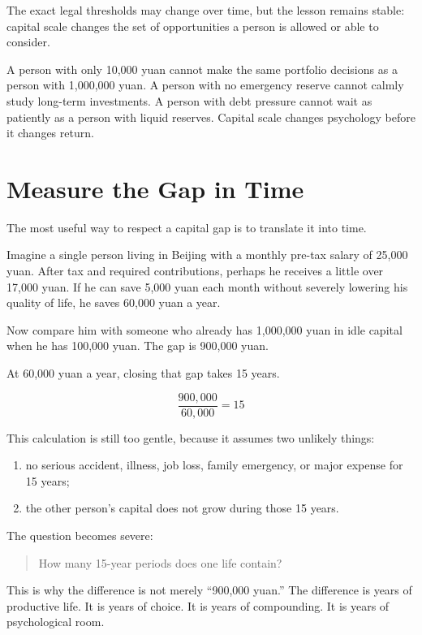 The exact legal thresholds may change over time, but the lesson remains stable: capital scale changes the set of opportunities a person is allowed or able to consider.

A person with only 10,000 yuan cannot make the same portfolio decisions as a person with 1,000,000 yuan. A person with no emergency reserve cannot calmly study long-term investments. A person with debt pressure cannot wait as patiently as a person with liquid reserves. Capital scale changes psychology before it changes return.

\section*{Measure the Gap in Time}

The most useful way to respect a capital gap is to translate it into time.

Imagine a single person living in Beijing with a monthly pre-tax salary of 25,000 yuan. After tax and required contributions, perhaps he receives a little over 17,000 yuan. If he can save 5,000 yuan each month without severely lowering his quality of life, he saves 60,000 yuan a year.

Now compare him with someone who already has 1,000,000 yuan in idle capital when he has 100,000 yuan. The gap is 900,000 yuan.

At 60,000 yuan a year, closing that gap takes 15 years.

\[
\frac{900{,}000}{60{,}000}=15
\]

This calculation is still too gentle, because it assumes two unlikely things:

\begin{enumerate}
\item no serious accident, illness, job loss, family emergency, or major expense for 15 years;
\item the other person's capital does not grow during those 15 years.
\end{enumerate}

The question becomes severe:

\begin{quote}
How many 15-year periods does one life contain?
\end{quote}

This is why the difference is not merely ``900,000 yuan.'' The difference is years of productive life. It is years of choice. It is years of compounding. It is years of psychological room.

